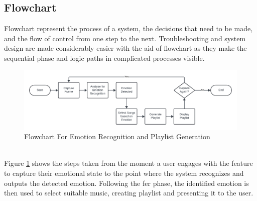 \subsection{Flowchart}
Flowchart represent the process of a system, the decisions that need to be made, and the flow of control from one step to the next.
Troubleshooting and system design are made considerably easier with the aid of flowchart as they make the sequential phase and logic paths in complicated processes visible. \citep{lucidchart_2019_what}
\begin{figure}[!ht]
    \centering
    \includegraphics[width=14cm]{Images/flowchart.png}
    \caption{Flowchart For Emotion Recognition and Playlist Generation}
    \label{fig:flowchart-fer-pg}
\end{figure}
\\
\indent Figure \ref{fig:flowchart-fer-pg} shows the steps taken from the moment a user engages with the feature to capture their emotional state to the point where the system recognizes and outputs the detected emotion.
Following the \gls{fer} phase, the identified emotion is then used to select suitable music, creating playlist and presenting it to the user. 
\\
